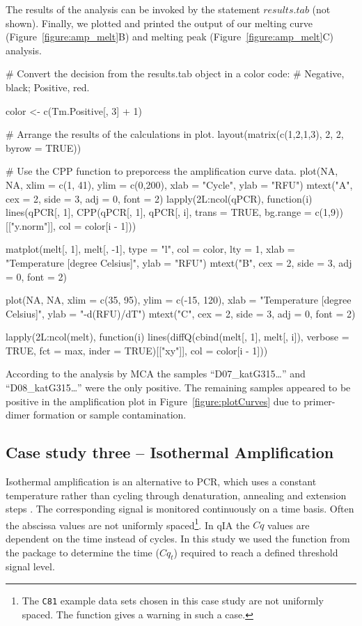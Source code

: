 The results of the analysis can be invoked by the statement $results.tab$ (not 
shown). Finally, we plotted and printed the output of our melting curve 
(Figure~\ref{figure:amp_melt}B) and melting peak (Figure~\ref{figure:amp_melt}C) 
analysis.

\begin{example}
# Convert the decision from the results.tab object in a color code:
# Negative, black; Positive, red.

color <- c(Tm.Positive[, 3] + 1)

# Arrange the results of the calculations in plot.
layout(matrix(c(1,2,1,3), 2, 2, byrow = TRUE))

# Use the CPP function to preporcess the amplification curve data.
plot(NA, NA, xlim = c(1, 41), ylim = c(0,200), xlab = "Cycle", ylab = "RFU")
mtext("A", cex = 2, side = 3, adj = 0, font = 2)
lapply(2L:ncol(qPCR), function(i) 
  lines(qPCR[, 1], 
        CPP(qPCR[, 1], qPCR[, i], trans = TRUE, 
            bg.range = c(1,9))[["y.norm"]],
        col = color[i - 1]))

matplot(melt[, 1], melt[, -1], type = "l", col = color, 
        lty = 1, xlab = "Temperature [degree Celsius]", ylab = "RFU")
mtext("B", cex = 2, side = 3, adj = 0, font = 2)

plot(NA, NA, xlim = c(35, 95), ylim = c(-15, 120), xlab = "Temperature [degree Celsius]", 
     ylab = "-d(RFU)/dT")
mtext("C", cex = 2, side = 3, adj = 0, font = 2)

lapply(2L:ncol(melt), function(i)
  lines(diffQ(cbind(melt[, 1], melt[, i]), verbose = TRUE, 
              fct = max, inder = TRUE)[["xy"]], col = color[i - 1]))
\end{example}

According to the analysis by MCA the samples ``D07\_katG315\ldots'' and 
``D08\_katG315\ldots'' were the only positive. The remaining samples appeared to 
be positive in the amplification plot in Figure~\ref{figure:plotCurves} due to 
primer-dimer formation or sample contamination.

\subsection{Case study three -- Isothermal Amplification}

Isothermal amplification is an alternative to PCR, which uses a constant 
temperature rather than cycling through denaturation, annealing and extension 
steps \citep{rodiger_nucleic_2014}. The corresponding signal is monitored 
continuously on a time basis. Often the abscissa values are not uniformly 
spaced\footnote{The \texttt{C81} example data sets chosen in this case study are 
not uniformly spaced. The  function gives a warning in such a case.}. 
In qIA the $Cq$ values are dependent on the time instead of cycles. In this 
study we used the  function from the  package to 
determine the time ($Cq_{t}$) required to reach a defined threshold signal 
level.

